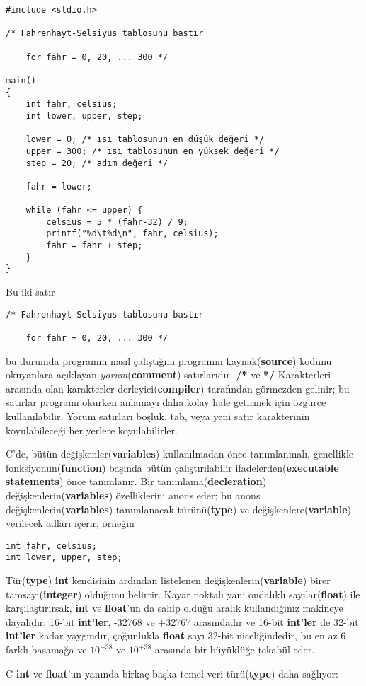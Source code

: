 \documentclass[a4paper,12pt,oneside]{book}
\begin{document}
\begin{lstlisting}
#include <stdio.h>

/* Fahrenhayt-Selsiyus tablosunu bastır

    for fahr = 0, 20, ... 300 */

main()
{
    int fahr, celsius;
    int lower, upper, step;

    lower = 0; /* ısı tablosunun en düşük değeri */
    upper = 300; /* ısı tablosunun en yüksek değeri */
    step = 20; /* adım değeri */

    fahr = lower;

    while (fahr <= upper) {
        celsius = 5 * (fahr-32) / 9;
        printf("%d\t%d\n", fahr, celsius);
        fahr = fahr + step;
    }
}
\end{lstlisting}
Bu iki satır \begin{lstlisting}
/* Fahrenhayt-Selsiyus tablosunu bastır

    for fahr = 0, 20, ... 300 */
\end{lstlisting}
bu durumda programın nasıl çalıştığını programın kaynak(\textbf{source}) kodunu okuyanlara açıklayan \textit{yorum}(\textbf{comment}) satırlarıdır. \textbf{/*} ve \textbf{*/} Karakterleri arasında olan karakterler derleyici(\textbf{compiler}) tarafından görmezden gelinir; bu satırlar programı okurken anlamayı daha kolay hale getirmek için özgürce kullanılabilir. Yorum satırları boşluk, tab, veya yeni satır karakterinin koyulabileceği her yerlere koyulabilirler.
\par C'de, bütün değişkenler(\textbf{variables}) kullanılmadan önce tanımlanmalı, genellikle fonksiyonun(\textbf{function}) başında bütün çalıştırılabilir ifadelerden(\textbf{executable statements}) önce tanımlanır. Bir tanımlama(\textbf{decleration}) değişkenlerin(\textbf{variables}) özelliklerini anons eder; bu anons değişkenlerin(\textbf{variables}) tanımlanacak türünü(\textbf{type}) ve değişkenlere(\textbf{variable}) verilecek adları içerir, örneğin
\newline
\begin{lstlisting}
int fahr, celsius;
int lower, upper, step;
\end{lstlisting}
Tür(\textbf{type}) \textbf{int} kendisinin ardından listelenen değişkenlerin(\textbf{variable}) birer tamsayı(\textbf{integer}) olduğunu belirtir. Kayar noktalı yani ondalıklı sayılar(\textbf{float}) ile karşılaştırırsak, \textbf{int} ve \textbf{float}'un da sahip olduğu aralık kullandığınız makineye dayalıdır; 16-bit \textbf{int'ler}, -32768 ve +32767 arasındadır ve 16-bit \textbf{int'ler} de 32-bit \textbf{int'ler} kadar yaygındır, çoğunlukla \textbf{float} sayı 32-bit niceliğindedir, bu en az 6 farklı basamağa ve $10^{-38}$ ve $10^{+38}$ arasında bir büyüklüğe tekabül eder.
\par C \textbf{int} ve \textbf{float}'un yanında birkaç başka temel veri türü(\textbf{type}) daha sağlıyor:
\end{document}
